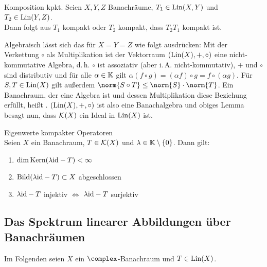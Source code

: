 \linie

\begin{Lemma}{Komposition kpkt.}
    Seien $X, Y, Z$ Banachräume, $T_1 \in \operatorname{Lin}(X, Y)$ und $T_2 \in \operatorname{Lin}(Y, Z)$.\\
    Dann folgt aus $T_1$ kompakt oder $T_2$ kompakt, dass $T_2 T_1$ kompakt ist.
\end{Lemma}

\begin{Bem}
    Algebraisch lässt sich das für $X = Y = Z$ wie folgt ausdrücken:
    Mit der Verkettung $\circ$ als Multiplikation ist der Vektorraum
    $(\operatorname{Lin}(X), +, \circ)$ eine nicht-kommutative Algebra,
    d.\,h. $\circ$ ist assoziativ (aber i.\,A. nicht-kommutativ),
    $+$ und $\circ$ sind distributiv und für alle $\alpha \in \mathbb{K}$ gilt
    $\alpha (f \circ g) = (\alpha f) \circ g = f \circ (\alpha g)$.
    Für $S, T \in \operatorname{Lin}(X)$ gilt außerdem $\norm{S \circ T} \le \norm{S} \cdot \norm{T}$.
    Ein Banachraum, der eine Algebra ist und dessen Multiplikation diese Beziehung erfüllt,
    heißt .
    $(\operatorname{Lin}(X), +, \circ)$ ist also eine Banachalgebra und obiges Lemma besagt nun,
    dass $\mathcal{K}(X)$ ein Ideal in $\operatorname{Lin}(X)$ ist.
\end{Bem}

\linie

\begin{Satz}{Eigenwerte kompakter Operatoren}\\
    Seien $X$ ein Banachraum, $T \in \mathcal{K}(X)$ und $\lambda \in \mathbb{K} \setminus \{0\}$.
    Dann gilt:
    \begin{enumerate}
        \item
        $\dim \text{Kern}(\lambda\text{id} - T) < \infty$

        \item
        $\text{Bild}(\lambda\text{id} - T) \subset X$ abgeschlossen

        \item
        $\lambda\text{id} - T$ injektiv $\iff$ $\lambda\text{id} - T$ surjektiv
    \end{enumerate}
\end{Satz}

\pagebreak

\subsection{%
    Das Spektrum linearer Abbildungen über Banachräumen%
}

\begin{Bem}
    Im Folgenden seien $X$ ein $\complex$-Banachraum und $T \in \operatorname{Lin}(X)$.
\end{Bem}

